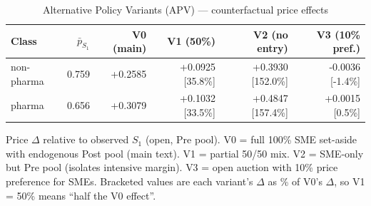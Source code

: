 \begin{table}[htbp]
\centering
\begin{threeparttable}
\caption{Alternative Policy Variants (APV) — counterfactual price effects}
\label{tab:v3_apv}
\small
\begin{tabular}{lrrrrr}
\toprule
Class & $\bar p_{S_1}$ & V0 (main) & V1 (50\%) & V2 (no entry) & V3 (10\% pref.) \\
\midrule
non-pharma & 0.759 & +0.2585 & +0.0925 [35.8\%] & +0.3930 [152.0\%] & -0.0036 [-1.4\%] \\
pharma & 0.656 & +0.3079 & +0.1032 [33.5\%] & +0.4847 [157.4\%] & +0.0015 [0.5\%] \\
\bottomrule
\end{tabular}
\begin{tablenotes}\footnotesize
\item Price $\Delta$ relative to observed $S_1$ (open, Pre pool).
V0 = full 100\% SME set-aside with endogenous Post pool (main text).
V1 = partial 50/50 mix. V2 = SME-only but Pre pool (isolates intensive
margin). V3 = open auction with 10\% price preference for SMEs.
Bracketed values are each variant's $\Delta$ as \% of V0's $\Delta$,
so V1 = 50\% means ``half the V0 effect''.
\end{tablenotes}
\end{threeparttable}
\end{table}
